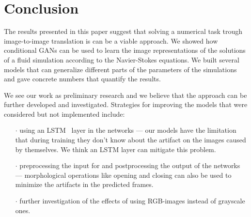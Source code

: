\documentclass{llncs}
\begin{document}
\section{Conclusion}\label{conclusion}
The results presented in this paper suggest that solving a numerical task trough image-to-image translation is can be a viable approach. We showed how conditional GANs can be used to learn the image representations of the solutions of a fluid simulation according to the Navier-Stokes equations. We built several models that can generalize different parts of the parameters of the simulations and gave concrete numbers that quantify the results.

We see our work as preliminary research and we believe that the approach can be further developed and investigated. Strategies for improving the models that were considered but not implemented include:
\begin{itemize}
\item[$\cdot$] using an LSTM~\cite{lstm} layer in the networks --- our models have the limitation that during training they don't know about the artifact on the images caused by themselves. We think an LSTM layer can mitigate this problem.
\item[$\cdot$] preprocessing the input for and postprocessing the output of the networks --- morphological operations like opening and closing can also be used to minimize the artifacts in the predicted frames.
\item[$\cdot$] further investigation of the effects of using RGB-images instead of grayscale ones.
\end{itemize}

\clearpage


\end{document}
